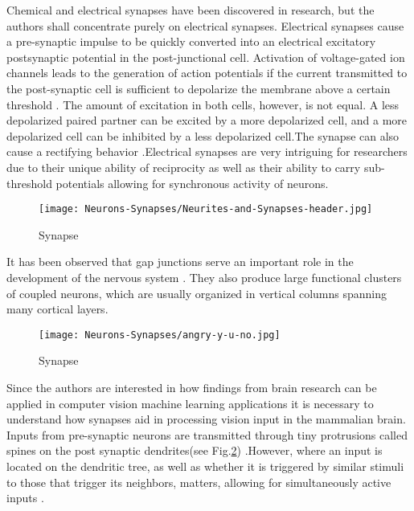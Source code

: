 \documentclass[12pt]{report}
\begin{document}
Chemical and electrical synapses have been discovered in research, but the authors shall concentrate purely on electrical synapses. Electrical synapses cause a pre-synaptic impulse to be quickly converted into an electrical excitatory postsynaptic potential in the post-junctional cell. Activation of voltage-gated ion channels leads to the generation of action potentials if the current transmitted to the post-synaptic cell is sufficient to depolarize the membrane above a certain threshold \cite{Hormuzdi2004}. The amount of excitation in both cells, however, is not equal. A less depolarized paired partner can be excited by a more depolarized cell, and a more depolarized cell can be inhibited by a less depolarized cell.The synapse can also cause a rectifying behavior \cite{Furshpan1959}.Electrical synapses are very intriguing for researchers due to their unique ability of reciprocity as well as their ability to carry sub-threshold potentials allowing for synchronous activity of neurons.

\begin{figure}[htp]
    \centering
    \texttt{[image: Neurons-Synapses/Neurites-and-Synapses-header.jpg]}
    \caption{Synapse}
    \label{fig:synapse}
\end{figure}

It has been observed that gap junctions serve an important role in the development of the nervous system \cite{Fischbach1972}. They also produce large functional clusters of coupled neurons, which are usually organized in vertical columns spanning many cortical layers\cite{Peinado1993}\cite{Yuste1992}.

\begin{figure}[htp]
    \centering
    \texttt{[image: Neurons-Synapses/angry-y-u-no.jpg]}
    \caption{Synapse}
    \label{fig:spines}
\end{figure}
Since the authors are interested in how findings from brain research can be applied in computer vision machine learning applications it is necessary to understand how synapses aid in processing vision input in the mammalian brain. Inputs from pre-synaptic neurons are transmitted through tiny protrusions called spines on the post synaptic dendrites(see Fig.\ref{fig:spines}) \cite{tobias2017}.However, where an input is located on the dendritic tree, as well as whether it is triggered by similar stimuli to those that trigger its neighbors, matters, allowing for simultaneously active inputs \cite{London2005}.
\end{document}
